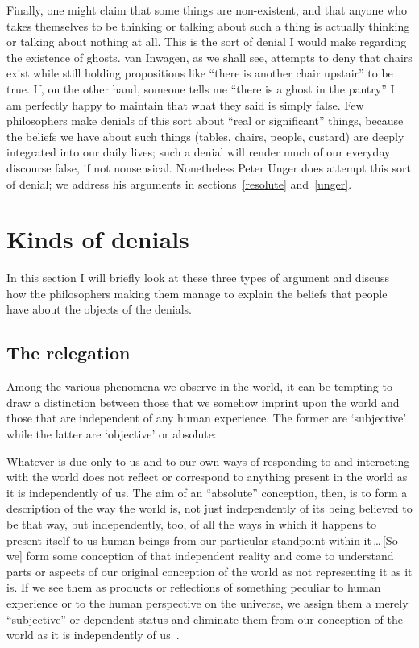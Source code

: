 \documentclass[11pt]{standalone}
\newenvironment{squote}{%
	\begin{spacing}{1}
	\begin{list}{}{%
	\setlength{\labelwidth}{0pt}%
	\rightmargin\leftmargin%
	}
	\item\relax
	}{%
	\end{list}%
	\end{spacing}
	}
\begin{document}
\begin{spacing}{1.5}
Finally, one might claim that some things are non-existent, and that
anyone who takes themselves to be thinking or talking about such a
thing is actually thinking or talking about nothing at all.  This is
the sort of denial I would make regarding the existence of ghosts.
van Inwagen, as we shall see, attempts to deny that chairs exist while
still holding propositions like ``there is another chair upstair'' to
be true.  If, on the other hand, someone tells me ``there is a ghost
in the pantry'' I am perfectly happy to maintain that what they said
is simply false.  Few philosophers make denials of this sort about
``real or significant'' things, because the beliefs we have about such
things (tables, chairs, people, custard) are deeply integrated into
our daily lives; such a denial will render much of our everyday
discourse false, if not nonsensical.  Nonetheless Peter Unger does
attempt this sort of denial; we address his arguments in
sections~\ref{resolute} and~\ref{unger}.

\section{Kinds of denials}
In this section I will briefly look at these three types of argument
and discuss how the philosophers making them manage to explain the
beliefs that people have about the objects of the denials.

\subsection{The relegation}
\label{relegate}
Among the various phenomena we observe in the world, it can be
tempting to draw a distinction between those that we somehow imprint
upon the world and those that are independent of any human experience.
The former are `subjective' while the latter are `objective' or
absolute:
\begin{squote}
Whatever is due only to us and to our own ways of responding to and
interacting with the world does not reflect or correspond to anything
present in the world as it is independently of us.  The aim of an
``absolute'' conception, then, is to form a description of the way the
world is, not just independently of its being believed to be that way,
but independently, too, of all the ways in which it happens to present
itself to us human beings from our particular standpoint within
it\,\ldots\,[So we] form some conception of that independent reality
and come to understand parts or aspects of our original conception of
the world as not representing it as it is.  If we see them as products
or reflections of something peculiar to human experience or to the
human perspective on the universe, we assign them a merely
``subjective'' or dependent status and eliminate them from our
conception of the world as it is independently of
us~\citep[30--31]{stroud2000a}.
\end{squote}


\end{spacing}
\end{document}
